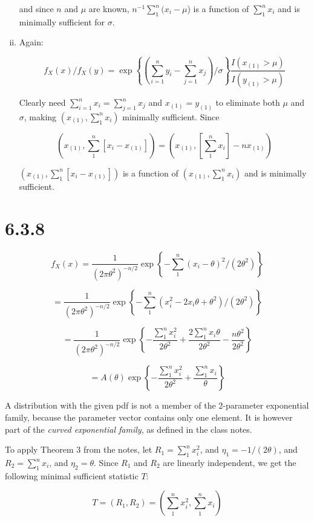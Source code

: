 \documentclass{article}
\begin{document}
\begin{enumerate}[(i)]
and since $n$ and $\mu$ are known, $n^{-1} \sum_1^n(x_i - \mu$)
is a function of $\sum_1^n x_i$ and is minimally sufficient for $\sigma$.

\item

Again:

\[
f_X(x)/f_X(y) = \exp \left\{ \left( \sum_{i=1}^n y_i - \sum_{j=1}^n x_j \right)
/\sigma \right\}
\frac{I(x_{(1)}>\mu)}{I(y_{(1)}>\mu)}
\]

Clearly need $\sum_{i=1}^n x_i = \sum_{j=1}^n x_j$ and $x_{(1)} = y_{(1)}$ to
eliminate both $\mu$ and $\sigma$, making $(x_{(1)}, \sum_1^n x_i)$
minimally sufficient. Since

\[
\left(x_{(1)}, \sum_1^n[x_i-x_{(1)}] \right) = 
\left(x_{(1)}, \left[\sum_1^n x_i \right] - nx_{(1)} \right)
\]

$\left(x_{(1)}, \sum_1^n[x_i-x_{(1)}] \right)$ is a function of
$(x_{(1)}, \sum_1^n x_i)$ and is minimally sufficient.

\end{enumerate}

\section{6.3.8}

\[
f_X(x) = \frac{1}{(2\pi\theta^2)^{-n/2}}
\exp \left\{ - \sum_1^n(x_i-\theta)^2/(2\theta^2) \right\}
\]

\[
= \frac{1}{(2\pi\theta^2)^{-n/2}}
\exp \left\{ - \sum_1^n(x_i^2-2x_i\theta+\theta^2)/(2\theta^2) \right\}
\]

\[
= \frac{1}{(2\pi\theta^2)^{-n/2}}
\exp \left\{-\frac{\sum_1^n x_i^2}{2\theta^2} + \frac{2 \sum_1^n x_i\theta}
{2\theta^2} - \frac{n\theta^2}{2\theta^2} \right\}
\]


\[
= A(\theta) \exp \left\{-\frac{\sum_1^n x_i^2}{2\theta^2} +
\frac{\sum_1^n x_i}{\theta} \right\}
\]

A distribution with the given pdf is not a member of the 2-parameter
exponential family, because the parameter vector contains only one element.
It is however part of the \emph{curved exponential family}, as defined in the
class notes.

To apply Theorem 3 from the notes, let $R_1 = \sum_1^n x_i^2$, and
$\eta_1 = -1/(2\theta)$, and $R_2 = \sum_1^n x_i$, and $\eta_2 = \theta$. Since
$R_1$ and $R_2$ are linearly independent, we get the following minimal
sufficient statistic $T$:

\[
T = (R_1,R_2) = \left(\sum_1^n x_i^2, \sum_1^n x_i\right)
\]
\end{document}
